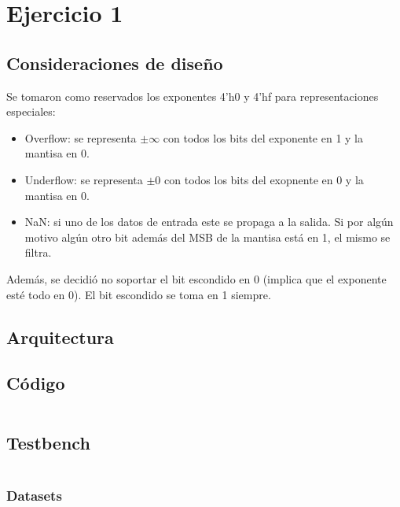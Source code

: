 \section{Ejercicio 1}

\subsection{Consideraciones de diseño}
Se tomaron como reservados los exponentes 4'h0 y 4'hf para representaciones especiales:
\begin{itemize}
    \item Overflow: se representa $\pm\infty$ con todos los bits del exponente en 1 y la mantisa en 0.
    \item Underflow: se representa $\pm 0$ con todos los bits del exopnente en 0 y la mantisa en 0.
    \item NaN: si uno de los datos de entrada este se propaga a la salida. Si por algún motivo algún otro bit además del MSB de la mantisa está en 1, el mismo se filtra.
\end{itemize}
Además, se decidió no soportar el bit escondido en 0 (implica que el exponente esté todo en 0). El bit escondido se toma en 1 siempre.

\subsection{Arquitectura}


\subsection{Código}
\inputminted[fontsize=\footnotesize]{systemverilog}{../floating_point_multiplier/rtl/floating_point_multiplier.sv}

\subsection{Testbench}
\inputminted[fontsize=\footnotesize]{systemverilog}{../floating_point_multiplier/tb/tb_floating_point_multiplier.sv}
\subsubsection{Datasets}
\inputminted[fontsize=\footnotesize]{systemverilog}{../floating_point_multiplier/tb/data_in_range.sv}
\inputminted[fontsize=\footnotesize]{systemverilog}{../floating_point_multiplier/tb/data_overflow.sv}
\inputminted[fontsize=\footnotesize]{systemverilog}{../floating_point_multiplier/tb/data_underflow.sv}
